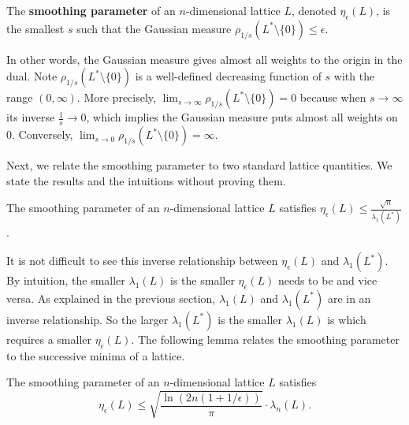 \documentclass[../main.tex]{subfiles}
\begin{document}
\begin{definition}
\label{def:smthPara}
The \textbf{smoothing parameter}  
\reversemarginpar
{}
of an $n$-dimensional lattice $L$, denoted $\eta_{\epsilon}(L)$, is the smallest $s$ such that the Gaussian measure $\rho_{1/s}(L^* \setminus \{0\}) \le \epsilon$.
\end{definition}

In other words, the Gaussian measure gives almost all weights to the origin in the dual. 
Note $\rho_{1/s}(L^* \setminus \{0\})$ is a well-defined decreasing function of $s$ with the range $(0, \infty)$. More precisely, $\lim_{s \rightarrow \infty} \rho_{1/s}(L^* \setminus \{0\}) = 0$ because when $s \rightarrow \infty$ its inverse $\frac{1}{s} \rightarrow 0$, which implies the Gaussian measure puts almost all weights on $0$. Conversely, $\lim_{s \rightarrow 0} \rho_{1/s}(L^* \setminus \{0\}) = \infty$.

Next, we relate the smoothing parameter to two standard lattice quantities. We state the results and the intuitions without proving them. 

\begin{lemma}
\reversemarginpar
{}
The smoothing parameter of an $n$-dimensional lattice $L$ satisfies $\eta_{\epsilon}(L) \le \frac{\sqrt{n}}{\lambda_1(L^*)}$.
\end{lemma}

It is not difficult to see this inverse relationship between $\eta_{\epsilon}(L)$ and $\lambda_1(L^*)$. By intuition, the smaller $\lambda_1(L)$ is the smaller $\eta_{\epsilon}(L)$ needs to be and vice versa. As explained in the previous section, $\lambda_1(L)$ and $\lambda_1(L^*)$ are in an inverse relationship. So the larger $\lambda_1(L^*)$ is the smaller $\lambda_1(L)$ is which requires a smaller $\eta_{\epsilon}(L)$. The following lemma relates the smoothing parameter to the successive minima of a lattice. 

\begin{lemma}
\label{lm:smthParUpperBd}
\reversemarginpar
{}
The smoothing parameter of an $n$-dimensional lattice $L$ satisfies 
\begin{equation*}
    \eta_{\epsilon}(L) \le \sqrt{\frac{\ln (2n(1+1/\epsilon))}{\pi}} \cdot \lambda_n(L).
\end{equation*}
\end{lemma}
\end{document}
